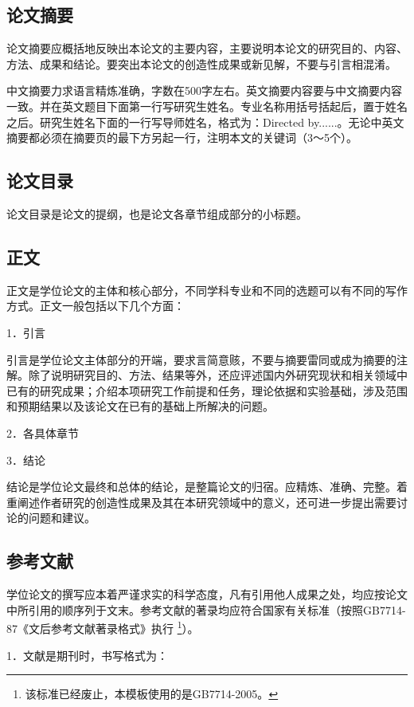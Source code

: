 \documentclass[a4paper,12pt,oneside,openany]{book}
\begin{document}
\begin{CJK}{UTF8}{hei}
\subsection{论文摘要}

论文摘要应概括地反映出本论文的主要内容，主要说明本论文的研究目的、内容、方法、成果和结论。要突出本论文的创造性成果或新见解，不要与引言相混淆。

中文摘要力求语言精炼准确，字数在500字左右。英文摘要内容要与中文摘要内容一致。并在英文题目下面第一行写研究生姓名。专业名称用括号括起后，置于姓名之后。研究生姓名下面的一行写导师姓名，格式为：Directed
by......。无论中英文摘要都必须在摘要页的最下方另起一行，注明本文的关键词（3～5个）。


\subsection{论文目录}

论文目录是论文的提纲，也是论文各章节组成部分的小标题。


\subsection{正文}

正文是学位论文的主体和核心部分，不同学科专业和不同的选题可以有不同的写作方式。正文一般包括以下几个方面：

1．引言

引言是学位论文主体部分的开端，要求言简意赅，不要与摘要雷同或成为摘要的注解。除了说明研究目的、方法、结果等外，还应评述国内外研究现状和相关领域中已有的研究成果；介绍本项研究工作前提和任务，理论依据和实验基础，涉及范围和预期结果以及该论文在已有的基础上所解决的问题。

2．各具体章节

3．结论

结论是学位论文最终和总体的结论，是整篇论文的归宿。应精炼、准确、完整。着重阐述作者研究的创造性成果及其在本研究领域中的意义，还可进一步提出需要讨论的问题和建议。


\subsection{参考文献}

学位论文的撰写应本着严谨求实的科学态度，凡有引用他人成果之处，均应按论文中所引用的顺序列于文末。参考文献的著录均应符合国家有关标准（按照GB7714-87《文后参考文献著录格式》执行%
\footnote{该标准已经废止，本模板使用的是GB7714-2005。%
}）。

1．文献是期刊时，书写格式为：


\end{CJK}
\end{document}
